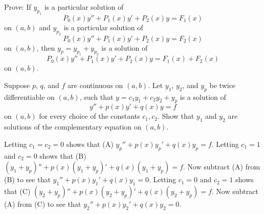 \documentclass{ximera}
\begin{document}
\begin{problem}\label{exer:5.3.39}
Prove: If $y_{p_1}$
is a particular solution of
$$
P_0(x)y''+P_1(x)y'+P_2(x)y=F_1(x)
$$
on $(a,b)$ and $y_{p_2}$ is a particular solution of
$$
P_0(x)y''+P_1(x)y'+P_2(x)y=F_2(x)
$$
on  $(a,b)$, then $y_p=y_{p_1}+y_{p_2}$ is a solution of
$$
P_0(x)y''+P_1(x)y'+P_2(x)y=F_1(x)+F_2(x)
$$
on $(a,b)$.
\end{problem}

\begin{problem}\label{exer:5.3.40}
Suppose $p$, $q$, and $f$ are continuous on $(a,b)$.
Let $y_1$, $y_2$, and $y_p$ be twice differentiable on $(a,b)$, such
that $y=c_1y_1+c_2y_2+y_p$ is a solution of
$$
y''+p(x)y'+q(x)y=f
$$
on $(a,b)$  for every choice of the
constants $c_1,c_2$. Show that  $y_1$  and $y_2$ are solutions of
the complementary equation on $(a,b)$.
\begin{solution}
Letting $c_1=c_2=0$ shows that (A) $y_p''+p(x)y_p'+q(x)y_p=f$.
Letting $c_1=1$ and $c_2=0$ shows that  (B) $(y_1+y_p)''+
p(x)(y_1+y_p)'+q(x)(y_1+y_p)=f$. Now subtract (A) from (B)
to see that $y_1''+p(x)y_1'+q(x)y_1=0$.
Letting $c_1=0$ and $c_2=1$ shows that  (C) $(y_2+y_p)''+
p(x)(y_2+y_p)'+q(x)(y_2+y_p)=f$. Now subtract (A) from (C)
to see that $y_2''+p(x)y_2'+q(x)y_2=0$.
\end{solution}
\end{problem}
\end{document}
